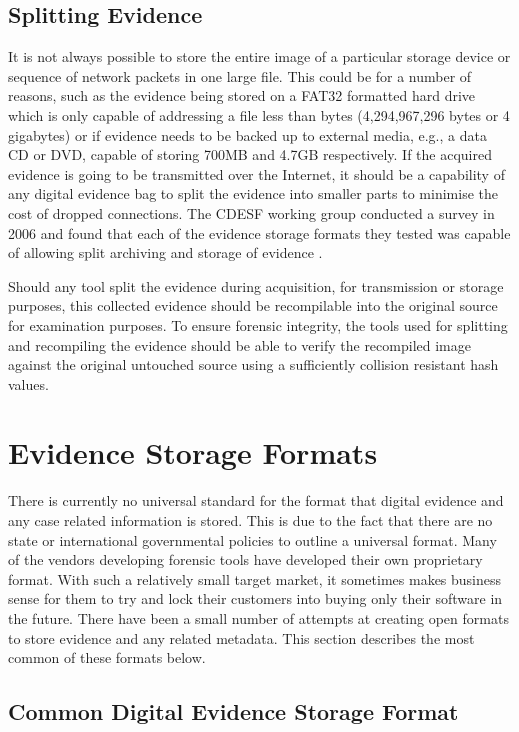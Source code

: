 \documentclass[runningheads,a4paper]{llncs}
\begin{document}
\subsection{Splitting Evidence}
\label{ch2:splitting}

It is not always possible to store the entire image of a particular storage device or sequence of network packets in one large file. This could be for a number of reasons, such as the evidence being stored on a FAT32 formatted hard drive which is only capable of addressing a file less than  bytes (4,294,967,296 bytes or 4 gigabytes) or if evidence needs to be backed up to external media, e.g., a data CD or DVD, capable of storing 700MB and 4.7GB respectively. If the acquired evidence is going to be transmitted over the Internet, it should be a capability of any digital evidence bag to split the evidence into smaller parts to minimise the cost of dropped connections. The CDESF working group conducted a survey in 2006 and found that each of the evidence storage formats they tested was capable of allowing split archiving and storage of evidence \cite{dfrws2006}. 

Should any tool split the evidence during acquisition, for transmission or storage purposes, this collected evidence should be recompilable into the original source for examination purposes. To ensure forensic integrity, the tools used for splitting and recompiling the evidence should be able to verify the recompiled image against the original untouched source using a sufficiently collision resistant hash values.

\section{Evidence Storage Formats}
\label{storage}

There is currently no universal standard for the format that digital evidence and any case related information is stored. This is due to the fact that there are no state or international governmental policies to outline a universal format. Many of the vendors developing forensic tools have developed their own proprietary format. With such a relatively small target market, it sometimes makes business sense for them to try and lock their customers into buying only their software in the future. There have been a small number of attempts at creating open formats to store evidence and any related metadata. This section describes the most common of these formats below.

\subsection{Common Digital Evidence Storage Format}
\label{ch2:cdesf}
\end{document}
